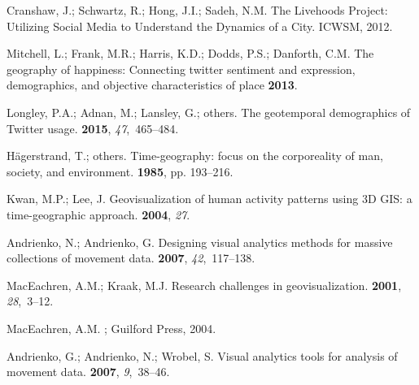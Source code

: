 \documentclass[ijgi,article,accept,moreauthors,pdftex,10pt,a4paper]{mdpi}
\theoremstyle{mdpi}
\newcounter{ex}
\newcounter{re}
\theoremstyle{mdpidefinition}
\begin{document}
\begin{thebibliography}{-------}
Cranshaw, J.; Schwartz, R.; Hong, J.I.; Sadeh, N.M.
\newblock The Livehoods Project: Utilizing Social Media to Understand the
  Dynamics of a City.
\newblock  ICWSM,  2012.

Mitchell, L.; Frank, M.R.; Harris, K.D.; Dodds, P.S.; Danforth, C.M.
\newblock The geography of happiness: Connecting twitter sentiment and
  expression, demographics, and objective characteristics of place {\bf 2013}.

Longley, P.A.; Adnan, M.; Lansley, G.; others.
\newblock The geotemporal demographics of Twitter usage.
 {\bf 2015}, {\em 47},~465--484.

H{\"a}gerstrand, T.; others.
\newblock Time-geography: focus on the corporeality of man, society, and
  environment.
 {\bf 1985}, pp. 193--216.

Kwan, M.P.; Lee, J.
\newblock Geovisualization of human activity patterns using 3D GIS: a
  time-geographic approach.
 {\bf 2004}, {\em 27}.

Andrienko, N.; Andrienko, G.
\newblock Designing visual analytics methods for massive collections of
  movement data.
 {\bf 2007}, {\em 42},~117--138.

MacEachren, A.M.; Kraak, M.J.
\newblock Research challenges in geovisualization.
 {\bf 2001}, {\em
  28},~3--12.

MacEachren, A.M.
;
  Guilford Press,  2004.

Andrienko, G.; Andrienko, N.; Wrobel, S.
\newblock Visual analytics tools for analysis of movement data.
 {\bf 2007}, {\em 9},~38--46.


\end{thebibliography}
\end{document}
